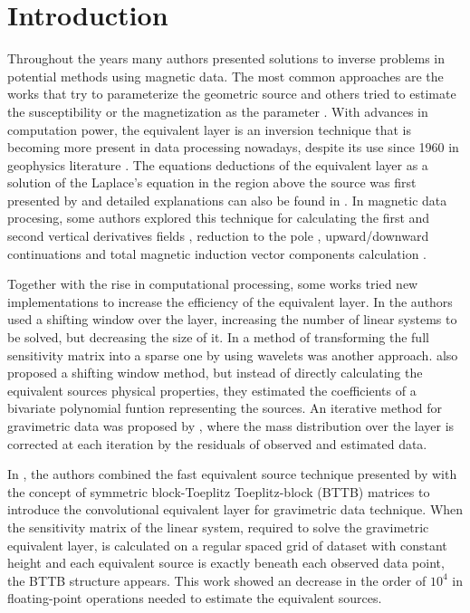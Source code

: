 \section{Introduction}

Throughout the years many authors presented solutions to inverse problems in potential methods using magnetic data. The most common approaches are the works that try to parameterize the geometric source \citep{bott1960use,pilkington1986determination,bhattacharyya1980generalized} and others tried to estimate the susceptibility or the magnetization as the parameter \citep{parker1974inversion,cribb1976application,li19963,liu20173d}. With advances in computation power, the equivalent layer is an inversion technique that is becoming more present in data processing nowadays, despite its use since 1960 in geophysics literature \citep{danes1961structure,bott1967solution,dampney1969}. The equations deductions of the equivalent layer as a solution of the Laplace's equation in the region above the source was first presented by \cite{kellogg1929} and detailed explanations can also be found in \cite{blakely1996}. In magnetic data procesing, some authors explored this technique for calculating the first and second vertical derivatives fields \citep{emilia1973}, reduction to the pole \citep{silva1986,oliveirajr-etal2013,li2014using}, upward/downward continuations \citep{hansen-miyazaki1984,li-oldenburg2010} and total magnetic induction vector components calculation \citep{sun2019constrained}.

Together with the rise in computational processing, some works tried new implementations to increase the efficiency of the equivalent layer. In \cite{leao-silva1989} the authors used a shifting window over the layer, increasing the number of linear systems to be solved, but decreasing the size of it. In \cite{li-oldenburg2010} a method of transforming the full sensitivity matrix into a sparse one by using wavelets was another approach. \cite{oliveirajr-etal2013} also proposed a shifting window method, but instead of directly calculating the equivalent sources physical properties, they estimated the coefficients of a bivariate polynomial funtion representing the sources. An iterative method for gravimetric data was proposed by \cite{siqueira-etal2017}, where the mass distribution over the layer is corrected at each iteration by the residuals of observed and estimated data.

In \cite{takahashi2020convolutional}, the authors combined the fast equivalent source technique presented by \cite{siqueira-etal2017} with the concept of symmetric block-Toeplitz Toeplitz-block (BTTB) matrices to introduce the convolutional equivalent layer for gravimetric data technique. When the sensitivity matrix of the linear system, required to solve the gravimetric equivalent layer, is calculated on a regular spaced grid of dataset with constant height and each equivalent source is exactly beneath each observed data point, the BTTB structure appears. This work showed an decrease in the order of $10^4$ in floating-point operations needed to estimate the equivalent sources.


